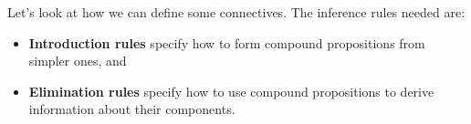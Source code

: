 





Let's look at how we can define some connectives.
The inference rules needed are:
\begin{itemize}
  \item \textbf{Introduction rules} specify how to form compound propositions from simpler ones, and
  \item \textbf{Elimination rules} specify how to use compound propositions to derive information about their components.
\end{itemize}


